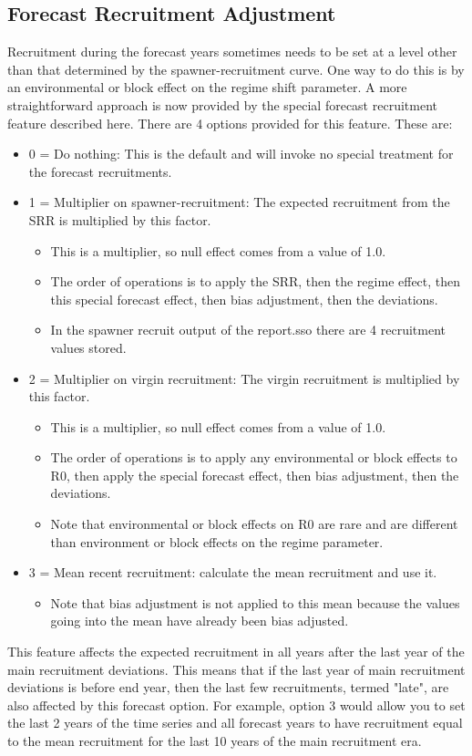 \subsection{Forecast Recruitment Adjustment}
Recruitment during the forecast years sometimes needs to be set at a level other than that determined by the spawner-recruitment curve.  One way to do this is by an environmental or block effect on the regime shift parameter.  A more straightforward approach is now provided by the special forecast recruitment feature described here. There are 4 options provided for this feature.  These are:
\begin{itemize}
	\item 0 = Do nothing: This is the default and will invoke no special treatment for the forecast recruitments.
	\item 1 = Multiplier on spawner-recruitment: The expected recruitment from the SRR is multiplied by this factor.
	\begin{itemize}
		\item This is a multiplier, so null effect comes from a value of 1.0.
		\item The order of operations is to apply the SRR, then the regime effect, then this special forecast effect, then bias adjustment, then the deviations.
		\item In the spawner recruit output of the report.sso there are 4 recruitment values stored.
	\end{itemize}
	\item 2 = Multiplier on virgin recruitment: The virgin recruitment is multiplied by this factor.
	\begin{itemize}
		\item This is a multiplier, so null effect comes from a value of 1.0.
		\item The order of operations is to apply any environmental or block effects to R0, then apply the special forecast effect, then bias adjustment, then the deviations.
		\item Note that environmental or block effects on R0 are rare and are different than environment or block effects on the regime parameter.
	\end{itemize}
	\item 3 = Mean recent recruitment: calculate the mean recruitment and use it.
	\begin{itemize}
		\item Note that bias adjustment is not applied to this mean because the values going into the mean have already been bias adjusted.
	\end{itemize}
\end{itemize}

This feature affects the expected recruitment in all years after the last year of the main recruitment deviations.  This means that if the last year of main recruitment deviations is before end year, then the last few recruitments, termed "late", are also affected by this forecast option.  For example, option 3 would allow you to set the last 2 years of the time series and all forecast years to have recruitment equal to the mean recruitment for the last 10 years of the main recruitment era.